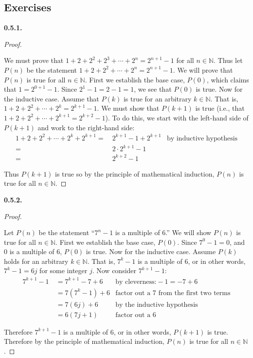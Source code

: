 \documentclass[12pt,]{book}
\theoremstyle{plain}
\theoremstyle{definition}
\theoremstyle{definition}
\theoremstyle{definition}
\numberwithin{equation}{chapter}
\newcommand{\N}{\mathbb N}
\newcommand{\amp}{&}
\begin{document}
\subsection*{ Exercises}
\noindent\textbf{0.5.1.} \begin{proof}\hypertarget{proof-5}{}
\hypertarget{p-429}{}%
We must prove that \(1 + 2 + 2^2 + 2^3 + \cdots +2^n = 2^{n+1} - 1\) for all \(n \in \N\). Thus let \(P(n)\) be the statement \(1 + 2 + 2^2 + \cdots + 2^n = 2^{n+1} - 1\). We will prove that \(P(n)\) is true for all \(n \in \N\). First we establish the base case, \(P(0)\), which claims that \(1 = 2^{0+1} -1\). Since \(2^1 - 1 = 2 - 1 = 1\), we see that \(P(0)\) is true. Now for the inductive case. Assume that \(P(k)\) is true for an arbitrary \(k \in \N\). That is, \(1 + 2 + 2^2 + \cdots + 2^k = 2^{k+1} - 1\). We must show that \(P(k+1)\) is true (i.e., that \(1 + 2 + 2^2 + \cdots + 2^{k+1} = 2^{k+2} - 1\)). To do this, we start with the left-hand side of \(P(k+1)\) and work to the right-hand side:%
\begin{align*}
1 + 2 + 2^2 + \cdots + 2^k + 2^{k+1} = \amp ~ 2^{k+1} - 1 + 2^{k+1} \amp \text{by inductive hypothesis}\\
= \amp ~2\cdot 2^{k+1} - 1 \amp\\
= \amp ~ 2^{k+2} - 1 \amp
\end{align*}
%
\par
\hypertarget{p-430}{}%
Thus \(P(k+1)\) is true so by the principle of mathematical induction, \(P(n)\) is true for all \(n \in \N\).%
\end{proof}
\par\smallskip
\noindent\textbf{0.5.2.} \begin{proof}\hypertarget{proof-6}{}
\hypertarget{p-432}{}%
Let \(P(n)\) be the statement ``\(7^n - 1\) is a multiple of 6.'' We will show \(P(n)\) is true for all \(n \in \N\). First we establish the base case, \(P(0)\). Since \(7^0 - 1 = 0\), and \(0\) is a multiple of 6, \(P(0)\) is true. Now for the inductive case. Assume \(P(k)\) holds for an arbitrary \(k \in \N\). That is, \(7^k - 1\) is a multiple of 6, or in other words, \(7^k - 1 = 6j\) for some integer \(j\). Now consider \(7^{k+1} - 1\):%
\begin{align*}
7^{k+1} - 1 ~ \amp = 7^{k+1} - 7 + 6 \amp \text{by cleverness:} -1 = -7 + 6\\
\amp = 7(7^k - 1) + 6 \amp \text{factor out a 7 from the first two terms}\\
\amp = 7(6j) + 6 \amp \text{by the inductive hypothesis}\\
\amp = 6(7j + 1) \amp \text{factor out a 6}
\end{align*}
%
\par
\hypertarget{p-433}{}%
Therefore \(7^{k+1} - 1\) is a multiple of 6, or in other words, \(P(k+1)\) is true. Therefore by the principle of mathematical induction, \(P(n)\) is true for all \(n \in \N\).%
\end{proof}
\end{document}
